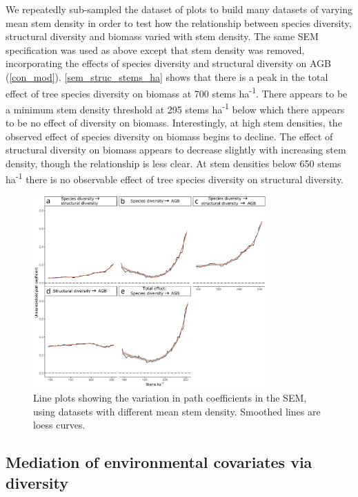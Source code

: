 \documentclass[11pt,a4paper]{article}
\begin{document}
We repeatedly sub-sampled the dataset of plots to build many datasets of varying mean stem density in order to test how the relationship between species diversity, structural diversity and biomass varied with stem density. The same SEM specification was used as above except that stem density was removed, incorporating the effects of species diversity and structural diversity on AGB (\autoref{con_mod}).  \autoref{sem_struc_stems_ha} shows that there is a peak in the total effect of tree species diversity on biomass at \textapprox{}700 stems ha\textsuperscript{-1}. There appears to be a minimum stem density threshold at \textapprox{}295 stems ha\textsuperscript{-1} below which there appears to be no effect of diversity on biomass. Interestingly, at high stem densities, the observed effect of species diversity on biomass begins to decline. The effect of structural diversity on biomass appears to decrease slightly with increasing stem density, though the relationship is less clear. At stem densities below \textapprox{}650 stems ha\textsuperscript{-1}  there is no observable effect of tree species diversity on structural diversity.

\begin{figure}[H]
\centering
	\includegraphics[width=0.8\textwidth]{sem_struc_stems_ha}
	\caption{Line plots showing the variation in path coefficients in the SEM, using datasets with different mean stem density. Smoothed lines are loess curves.}
	\label{sem_struc_stems_ha}
\end{figure}

\subsection{Mediation of environmental covariates via diversity}
\end{document}
